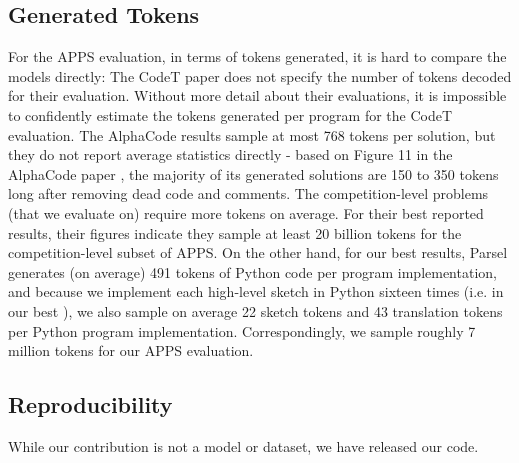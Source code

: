 \subsection{Generated Tokens}
\label{tokencounts}
For the APPS evaluation, in terms of tokens generated, it is hard to compare the models directly: The CodeT paper does not specify the number of tokens decoded for their evaluation. Without more detail about their evaluations, it is impossible to confidently estimate the tokens generated per program for the CodeT evaluation. The AlphaCode results sample at most 768 tokens per solution, but they do not report average statistics directly - based on Figure 11 in the AlphaCode paper \citep{li2022competition}, the majority of its generated solutions are 150 to 350 tokens long after removing dead code and comments. The competition-level problems (that we evaluate on) require more tokens on average. For their best reported results, their figures indicate they sample at least 20 billion tokens for the competition-level subset of APPS. On the other hand, for our best results, Parsel generates (on average) 491 tokens of Python code per program implementation, and because we implement each high-level sketch in Python sixteen times (i.e.  in our best ), we also sample on average 22 sketch tokens and 43 translation tokens per Python program implementation. Correspondingly, we sample roughly 7 million tokens for our APPS evaluation.


\subsection{Reproducibility}
While our contribution is not a model or dataset, we have released our code.